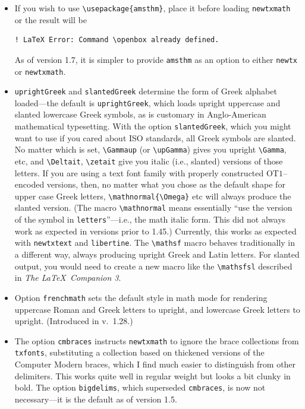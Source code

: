 \documentclass[\fsc]{article}
\theoremstyle{oldplain}
\theoremstyle{plain}
\begin{document}
\begin{itemize}
requires  {\tt amsmath}---there is no need to load it separately.
\item If you wish to use \verb|\usepackage{amsthm}|, place it before loading {\tt newtxmath} or the result will  be
\begin{verbatim}
! LaTeX Error: Command \openbox already defined.
\end{verbatim}
As of version 1.7, it is simpler to provide {\tt amsthm} as an option to either {\tt newtx} or {\tt newtxmath}.
\item {\tt uprightGreek} and {\tt slantedGreek} determine the form of Greek alphabet loaded---the default is {\tt uprightGreek}, which loads upright uppercase and slanted lowercase Greek symbols, as is customary in Anglo-American mathematical typesetting. With the option {\tt slantedGreek}, which you might want to use if you cared about ISO standards, all Greek symbols are slanted. No matter which is set, \verb|\Gammaup| (or \verb|\upGamma|) gives you upright \verb|\Gamma|, etc, and \verb|\Deltait|, \verb|\zetait| give you italic (i.e., slanted) versions of those letters. If you are using a text font family with properly constructed OT$1$--encoded versions, then, no matter what you chose as the default shape for upper case Greek letters, \verb|\mathnormal{\Omega}| etc will always produce the slanted version. (The macro \verb|\mathnormal| means essentially ``use the version of the symbol in {\tt letters}''---i.e., the math italic form.  This did not always work as expected in versions prior to 1.45.) Currently, this works as expected with {\tt newtxtext} and {\tt libertine}. The \verb|\mathsf| macro behaves traditionally in a different way, always producing upright Greek and Latin letters. For slanted output, you would need to create a new macro like the \verb|\mathsfsl| described in \emph{The \LaTeX\ Companion 3}.
\item Option {\tt frenchmath} sets the default style in math mode for rendering uppercase Roman and Greek letters to upright, and lowercase Greek letters to upright. (Introduced in v.\ 1.28.)
\item The option {\tt cmbraces} instructs {\tt newtxmath} to ignore the brace collections from {\tt txfonts}, substituting a collection based on thickened versions of the Computer Modern braces, which I find much easier to distinguish from other delimiters. This works quite well in regular weight but looks a bit clunky in bold. The option {\tt bigdelims}, which superseded {\tt cmbraces}, is now not necessary---it is the default as of version 1.5.

\end{itemize}
\end{document}
